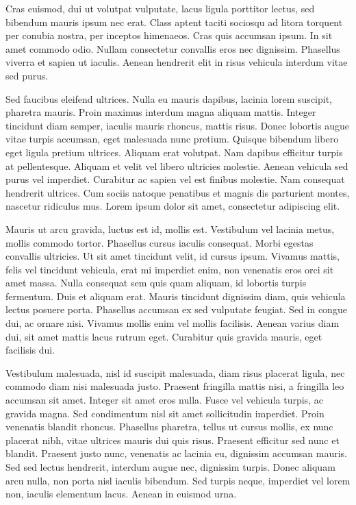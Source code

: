 Cras euismod, dui ut volutpat vulputate, lacus ligula porttitor lectus, sed bibendum mauris ipsum nec erat. Class aptent taciti sociosqu ad litora torquent per conubia nostra, per inceptos himenaeos. Cras quis accumsan ipsum. In sit amet commodo odio. Nullam consectetur convallis eros nec dignissim. Phasellus viverra et sapien ut iaculis. Aenean hendrerit elit in risus vehicula interdum vitae sed purus.

Sed faucibus eleifend ultrices. Nulla eu mauris dapibus, lacinia lorem suscipit, pharetra mauris. Proin maximus interdum magna aliquam mattis. Integer tincidunt diam semper, iaculis mauris rhoncus, mattis risus. Donec lobortis augue vitae turpis accumsan, eget malesuada nunc pretium. Quisque bibendum libero eget ligula pretium ultrices. Aliquam erat volutpat. Nam dapibus efficitur turpis at pellentesque. Aliquam et velit vel libero ultricies molestie. Aenean vehicula sed purus vel imperdiet. Curabitur ac sapien vel est finibus molestie. Nam consequat hendrerit ultrices. Cum sociis natoque penatibus et magnis dis parturient montes, nascetur ridiculus mus. Lorem ipsum dolor sit amet, consectetur adipiscing elit.

Mauris ut arcu gravida, luctus est id, mollis est. Vestibulum vel lacinia metus, mollis commodo tortor. Phasellus cursus iaculis consequat. Morbi egestas convallis ultricies. Ut sit amet tincidunt velit, id cursus ipsum. Vivamus mattis, felis vel tincidunt vehicula, erat mi imperdiet enim, non venenatis eros orci sit amet massa. Nulla consequat sem quis quam aliquam, id lobortis turpis fermentum. Duis et aliquam erat. Mauris tincidunt dignissim diam, quis vehicula lectus posuere porta. Phasellus accumsan ex sed vulputate feugiat. Sed in congue dui, ac ornare nisi. Vivamus mollis enim vel mollis facilisis. Aenean varius diam dui, sit amet mattis lacus rutrum eget. Curabitur quis gravida mauris, eget facilisis dui.

Vestibulum malesuada, nisl id suscipit malesuada, diam risus placerat ligula, nec commodo diam nisi malesuada justo. Praesent fringilla mattis nisi, a fringilla leo accumsan sit amet. Integer sit amet eros nulla. Fusce vel vehicula turpis, ac gravida magna. Sed condimentum nisl sit amet sollicitudin imperdiet. Proin venenatis blandit rhoncus. Phasellus pharetra, tellus ut cursus mollis, ex nunc placerat nibh, vitae ultrices mauris dui quis risus. Praesent efficitur sed nunc et blandit. Praesent justo nunc, venenatis ac lacinia eu, dignissim accumsan mauris. Sed sed lectus hendrerit, interdum augue nec, dignissim turpis. Donec aliquam arcu nulla, non porta nisl iaculis bibendum. Sed turpis neque, imperdiet vel lorem non, iaculis elementum lacus. Aenean in euismod urna.

